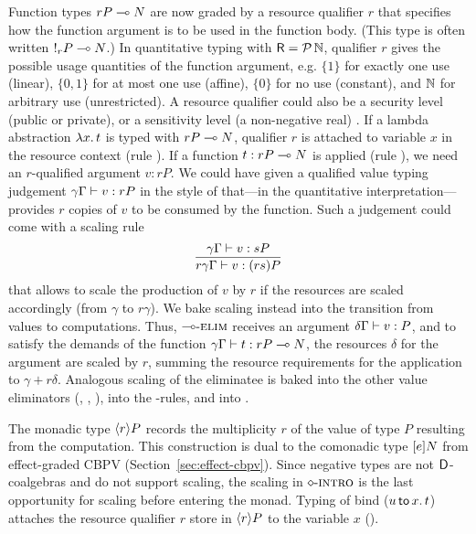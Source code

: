 \documentclass[acmsmall,review,anonymous]{acmart}\settopmatter{printfolios=true,printccs=false,printacmref=false}
\begin{document}
Function types $\qfun r P N$ are now graded by a resource qualifier
$r$ that specifies how the function argument is to be used in the
function body.  (This type is often written $!_{r}P \lolli N$.)  In
quantitative typing with $\R = \Pot \bN$, qualifier $r$ gives the
possible usage quantities of the function argument, e.g. $\{1\}$ for
exactly one use (linear), $\{0,1\}$ for at most one use (affine),
$\{0\}$ for no use (constant), and $\bN$ for arbitrary use
(unrestricted).  A resource qualifier could also be a security level
(public or private), or a sensitivity level (a non-negative real)
\citep{reedPeirce:icfp10}.  If a lambda abstraction $\lam x t$ is
typed with $\qfun r P N$, qualifier $r$ is attached to variable $x$ in
the resource context (rule \rintro\lolli).  If a function
$t : \qfun r P N$ is applied (rule \relim\lolli), we need an
$r$-qualified argument $v : rP$.  We could have given a qualified
value typing judgement $\qValTy \gamma \Gamma v {rP}$ in the style of
\citet{mcBride:wadler60} that---in the quantitative
interpretation---provides $r$ copies of $v$ to be consumed by the
function.  Such a judgement could come with a scaling rule
\[
\ru{\qValTy \gamma \Gamma v {sP}
  }{\qValTy{r\gamma}\Gamma v {(rs)P}}
\]
that allows to scale the production of $v$ by $r$ if the resources are
scaled accordingly (from $\gamma$ to $r\gamma$).  We bake scaling instead
into the transition from values to computations.
Thus, $\relim\lolli$ receives an
argument $\qValTy \delta \Gamma v P$, and to satisfy the demands of
the function $\qCompTy \gamma \Gamma t {\qfun r P N}$, the resources
$\delta$ for the argument are scaled by $r$, summing the resource
requirements for the application to $\gamma + r\delta$.
%
Analogous scaling of the eliminatee is baked into the other value
eliminators (\relim\Box, \relim\GS, \relim\otimes), into the
\rlet-rules, and into \rintro\diamond.

The monadic type $\compty r P$ records the multiplicity $r$ of the
value of type $P$ resulting from the computation.  This construction
is dual to the comonadic type $\thunkty e N$ from effect-graded CBPV
(Section~\ref{sec:effect-cbpv}).  Since negative types are not
$\D$-coalgebras and do not support scaling, the scaling in
$\rintro\diamond$ is the last opportunity for scaling before entering
the monad.  Typing of bind ($\bind x u t$) attaches the resource qualifier $r$ store in $\compty r P$ to the variable $x$ (\relim\diamond).
\end{document}
